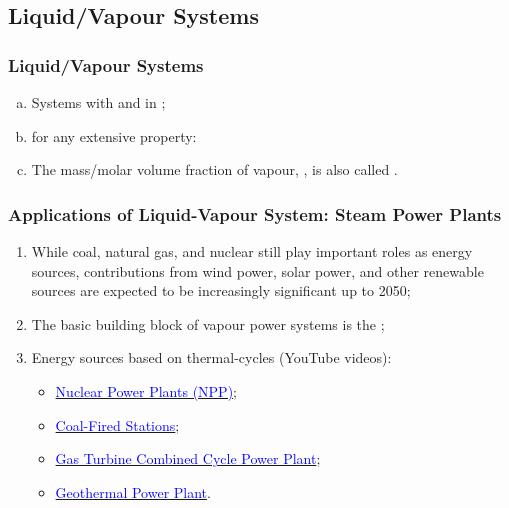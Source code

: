 \documentclass[10pt,compress,unknownkeysallowed]{beamer}
\begin{document}
\subsection{Liquid/Vapour Systems}
\begin{frame}
  \frametitle{Liquid/Vapour Systems}
     \begin{enumerate}[(a)]
         \item<1-> Systems with  and  in ;
         \item<2->  for any extensive property:
         \item<4-> The mass/molar volume fraction of vapour, , is also called . 
     \end{enumerate}

\end{frame}
\normalsize

\begin{frame}
 \frametitle{Applications of Liquid-Vapour System: Steam Power Plants}

    \begin{enumerate}%
     \item <1-> While coal, natural gas, and nuclear still play important roles as energy sources, contributions from wind power, solar power, and other renewable sources are expected to be increasingly significant up to 2050;
     \item <3-> The basic building block of vapour power systems is the ;
     \item <4-> Energy sources based on thermal-cycles (YouTube videos):
        \begin{itemize}%
           \item \href{http://www.youtube.com/watch?v=_UwexvaCMWA}{\textcolor{blue}{Nuclear Power Plants (NPP)}};
           \item \href{http://www.youtube.com/watch?v=0mjT8ETB128}{\textcolor{blue}{Coal-Fired Stations}};
           \item \href{http://www.youtube.com/watch?v=oi1TRbiE_Kw}{\textcolor{blue}{Gas Turbine Combined Cycle Power Plant}};
           \item \href{https://www.youtube.com/watch?v=kjpp2MQffnw}{\textcolor{blue}{Geothermal Power Plant}}.
        \end{itemize}
    \end{enumerate} 
 \normalsize
\end{frame}
\end{document}
